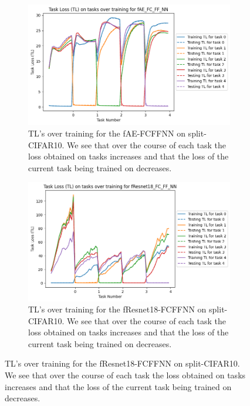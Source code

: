\begin{appendices}
\begin{figure}[ht]
    \medskip %
    
    \begin{subfigure}[t]{0.4\textwidth}
       \includegraphics[width=\linewidth]{images/CIFAR10_CL/fAE_FC_FF_NN_TL_task.png}
       \caption{TL's over training for the fAE-FCFFNN on split-CIFAR10. We see that over the course of each task the loss obtained on tasks increases and that the loss of the current task being trained on decreases.}
    \end{subfigure}
    \quad %
    \begin{subfigure}[t]{0.4\textwidth}
       \includegraphics[width=\linewidth]{images/CIFAR10_CL/fResnet18_FC_FF_NN_TL_task.png}
       \caption{TL's over training for the fResnet18-FCFFNN on split-CIFAR10. We see that over the course of each task the loss obtained on tasks increases and that the loss of the current task being trained on decreases.}
    \end{subfigure}

    \medskip %


\end{figure}
\end{appendices}

